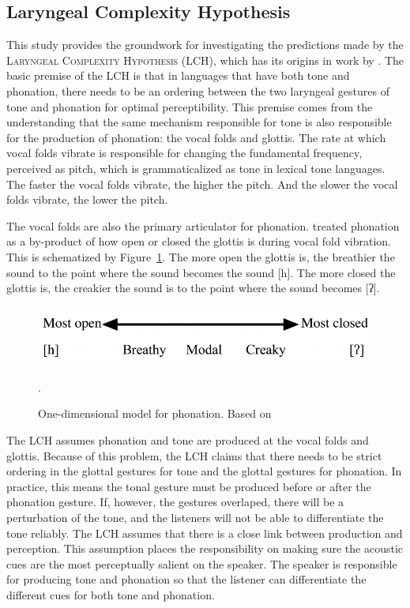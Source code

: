\documentclass[12pt, letterpaper]{article}
\begin{document}
\subsection{Laryngeal Complexity Hypothesis} \label{sec:LCH}
This study provides the groundwork for investigating the predictions made by the \textsc{Laryngeal Complexity Hypothesis} (LCH), which has its origins in work by \citet{silvermanLaryngealComplexityOtomanguean1997,blankenshipTimeCourseBreathiness1997,blankenshipTimingNonmodalPhonation2002}. The basic premise of the LCH is that in languages that have both tone and phonation, there needs to be an ordering between the two laryngeal gestures of tone and phonation for optimal perceptibility. This premise comes from the understanding that the same mechanism responsible for tone is also responsible for the production of phonation: the vocal folds and glottis. The rate at which vocal folds vibrate is responsible for changing the fundamental frequency, perceived as pitch, which is grammaticalized as tone in lexical tone languages. The faster the vocal folds vibrate, the higher the pitch. And the slower the vocal folds vibrate, the lower the pitch. 

The vocal folds are also the primary articulator for phonation. \citet{ladefogedPreliminariesLinguisticPhonetics1971,gordonPhonationTypesCrosslinguistic2001} treated phonation as a by-product of how open or closed the glottis is during vocal fold vibration. This is schematized by Figure~\ref{fig:Phonation}. The more open the glottis is, the breathier the sound to the point where the sound becomes the sound [h]. The more closed the glottis is, the creakier the sound is to the point where the sound becomes [ʔ]. 

\begin{figure}[!ht]
	\centering
	\includegraphics[width=.6\textwidth]{Phonation.png}
	\caption{One-dimensional model for phonation. Based on \citet{ladefogedPreliminariesLinguisticPhonetics1971,gordonPhonationTypesCrosslinguistic2001}}.
	\label{fig:Phonation}
\end{figure}

The LCH assumes phonation and tone are produced at the vocal folds and glottis. Because of this problem, the LCH claims that there needs to be strict ordering in the glottal gestures for tone and the glottal gestures for phonation. In practice, this means the tonal gesture must be produced before or after the phonation gesture. If, however, the gestures overlaped, there will be a perturbation of the tone, and the listeners will not be able to differentiate the tone reliably. The LCH assumes that there is a close link between production and perception. This assumption places the responsibility on making sure the acoustic cues are the most perceptually salient on the speaker. The speaker is responsible for producing tone and phonation so that the listener can differentiate the different cues for both tone and phonation. 
\end{document}
